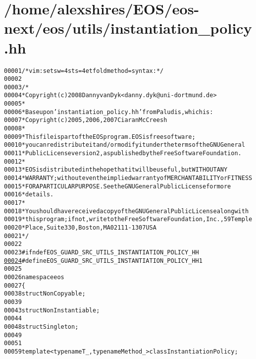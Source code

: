 \hypertarget{instantiation__policy_8hh_source}{
\section{/home/alexshires/EOS/eos-\/next/eos/utils/instantiation\_\-policy.hh}
}


\begin{footnotesize}\begin{alltt}
00001 \textcolor{comment}{/* vim: set sw=4 sts=4 et foldmethod=syntax : */}
00002 
00003 \textcolor{comment}{/*}
00004 \textcolor{comment}{ * Copyright (c) 2008 Danny van Dyk <danny.dyk@uni-dortmund.de>}
00005 \textcolor{comment}{ *}
00006 \textcolor{comment}{ * Base upon 'instantiation\_policy.hh' from Paludis, which is:}
00007 \textcolor{comment}{ *     Copyright (c) 2005, 2006, 2007 Ciaran McCreesh}
00008 \textcolor{comment}{ *}
00009 \textcolor{comment}{ * This file is part of the EOS program. EOS is free software;}
00010 \textcolor{comment}{ * you can redistribute it and/or modify it under the terms of the GNU General}
00011 \textcolor{comment}{ * Public License version 2, as published by the Free Software Foundation.}
00012 \textcolor{comment}{ *}
00013 \textcolor{comment}{ * EOS is distributed in the hope that it will be useful, but WITHOUT ANY}
00014 \textcolor{comment}{ * WARRANTY; without even the implied warranty of MERCHANTABILITY or FITNESS}
00015 \textcolor{comment}{ * FOR A PARTICULAR PURPOSE.  See the GNU General Public License for more}
00016 \textcolor{comment}{ * details.}
00017 \textcolor{comment}{ *}
00018 \textcolor{comment}{ * You should have received a copy of the GNU General Public License along with}
00019 \textcolor{comment}{ * this program; if not, write to the Free Software Foundation, Inc., 59 Temple}
00020 \textcolor{comment}{ * Place, Suite 330, Boston, MA  02111-1307  USA}
00021 \textcolor{comment}{ */}
00022 
00023 \textcolor{preprocessor}{#ifndef EOS\_GUARD\_SRC\_UTILS\_INSTANTIATION\_POLICY\_HH}
\hypertarget{instantiation__policy_8hh_source_l00024}{}\hyperlink{instantiation__policy_8hh_abd336977b5f10aab9894e0790cec50a3}{00024} \textcolor{preprocessor}{}\textcolor{preprocessor}{#define EOS\_GUARD\_SRC\_UTILS\_INSTANTIATION\_POLICY\_HH 1}
00025 \textcolor{preprocessor}{}
00026 \textcolor{keyword}{namespace }eos
00027 \{
00038     \textcolor{keyword}{struct }NonCopyable;
00039 
00043     \textcolor{keyword}{struct }NonInstantiable;
00044 
00048     \textcolor{keyword}{struct }Singleton;
00049 
00051 
00059     \textcolor{keyword}{template} <\textcolor{keyword}{typename} T\_, \textcolor{keyword}{typename} Method\_> \textcolor{keyword}{class }InstantiationPolicy;

\end{alltt}
\end{footnotesize}
